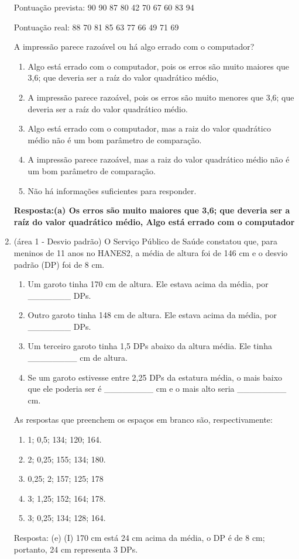 \documentclass[12pt]{article}\documentclass[brazilian,12pt,a4paper,final]{article}
\begin{document}
\begin{enumerate}
Pontuação prevista: 90 90 87 80 42 70 67 60 83 94

\hspace{0,8cm}Pontuação real: 88 70 81 85 63 77 66 49 71 69

A impressão parece razoável ou há algo errado com o computador?
\begin{enumerate}
    \item  Algo está errado com o computador, pois os erros são muito maiores que 3,6; que deveria ser a raíz do valor quadrático médio, 
    \item  A impressão parece razoável, pois os erros são muito menores que 3,6; que deveria ser a raíz do valor quadrático médio.
    \item  Algo está errado com o computador, mas a raiz do valor quadrático médio não é um bom parâmetro de comparação.
    \item A impressão parece razoável, mas a raiz do valor quadrático médio não é um bom parâmetro de comparação.
    \item Não há informações suficientes para responder.
\end{enumerate}

\textbf{Resposta:(a) Os erros são muito maiores que 3,6; que deveria ser a raíz do valor quadrático médio, Algo está errado com o computador}

\item (área 1 - Desvio padrão) O Serviço Público de Saúde constatou que, para meninos de 11 anos no HANES2, a média
de altura foi de 146 cm e o desvio padrão (DP) foi de 8 cm.
\begin{enumerate}[label=(\Roman*)]
\item Um garoto tinha 170 cm de altura. Ele estava acima da média, por \_\_\_\_\_\_\_ DPs.
\item Outro garoto tinha 148 cm de altura. Ele estava acima da média, por \_\_\_\_\_\_\_ DPs.
\item Um terceiro garoto tinha 1,5 DPs abaixo da altura média. Ele tinha \_\_\_\_\_\_\_\_ cm de altura.
\item Se um garoto estivesse entre 2,25 DPs da estatura média, o mais baixo que ele poderia ser é \_\_\_\_\_\_\_\_ cm e o mais alto seria \_\_\_\_\_\_\_\_ cm.
\end{enumerate}
As respostas que preenchem os espaços em branco são, respectivamente:
\begin{enumerate}
    \item 1; 0,5; 134; 120; 164.
    \item 2; 0,25; 155; 134; 180.
    \item 0,25; 2; 157; 125; 178
    \item 3; 1,25; 152; 164; 178.
    \item 3; 0,25; 134; 128; 164.
\end{enumerate}
Resposta:
(e)
(I) 170 cm está 24 cm acima da média, o DP é de 8 cm; portanto, 24 cm representa 3 DPs.


\end{enumerate}
\end{document}
